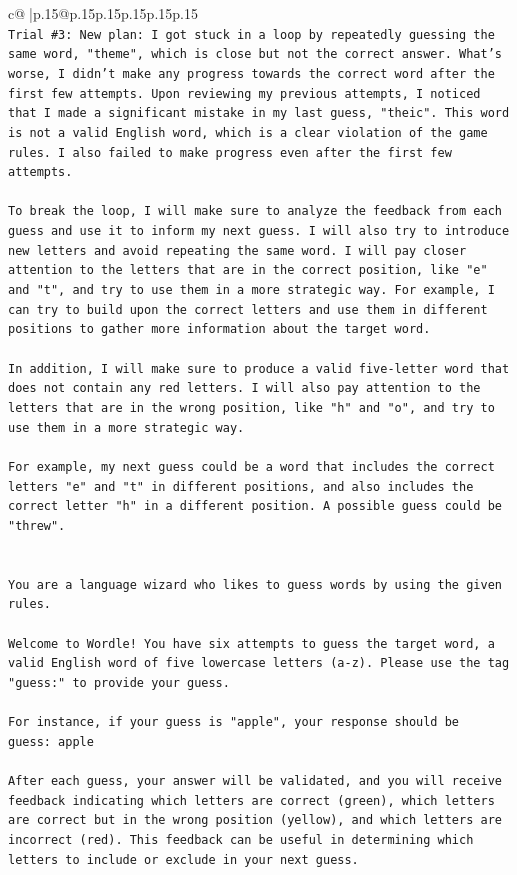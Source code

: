 \documentclass{article}
\begin{document}
{\begin{supertabular}{c@{$\;$}|p{.15\linewidth}@{}p{.15\linewidth}p{.15\linewidth}p{.15\linewidth}p{.15\linewidth}p{.15\linewidth}}
{{{\\ 
\texttt{Trial \#3: New plan: I got stuck in a loop by repeatedly guessing the same word, "theme", which is close but not the correct answer. What's worse, I didn't make any progress towards the correct word after the first few attempts. Upon reviewing my previous attempts, I noticed that I made a significant mistake in my last guess, "theic". This word is not a valid English word, which is a clear violation of the game rules. I also failed to make progress even after the first few attempts. } \\
\\ 
\texttt{To break the loop, I will make sure to analyze the feedback from each guess and use it to inform my next guess. I will also try to introduce new letters and avoid repeating the same word. I will pay closer attention to the letters that are in the correct position, like "e" and "t", and try to use them in a more strategic way. For example, I can try to build upon the correct letters and use them in different positions to gather more information about the target word. } \\
\\ 
\texttt{In addition, I will make sure to produce a valid five{-}letter word that does not contain any red letters. I will also pay attention to the letters that are in the wrong position, like "h" and "o", and try to use them in a more strategic way. } \\
\\ 
\texttt{For example, my next guess could be a word that includes the correct letters "e" and "t" in different positions, and also includes the correct letter "h" in a different position. A possible guess could be "threw".} \\
\\ 
\\ 
\texttt{You are a language wizard who likes to guess words by using the given rules.} \\
\\ 
\texttt{Welcome to Wordle! You have six attempts to guess the target word, a valid English word of five lowercase letters (a{-}z). Please use the tag "guess:" to provide your guess.} \\
\\ 
\texttt{For instance, if your guess is "apple", your response should be} \\
\texttt{guess: apple} \\
\\ 
\texttt{After each guess, your answer will be validated, and you will receive feedback indicating which letters are correct (green), which letters are correct but in the wrong position (yellow), and which letters are incorrect (red). This feedback can be useful in determining which letters to include or exclude in your next guess.} \\
}}}
\end{supertabular}}
\end{document}
